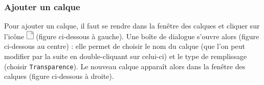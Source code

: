 \vfill
\phantom{rien}






\subsubsection{Ajouter un calque}\label{Gimp2CalquesAjouter}

Pour ajouter un calque, il faut se rendre dans la fenêtre des calques et cliquer sur l'icône \includegraphics[width=.4cm]{./images/image02/CalqueAjouter} (figure ci-dessous à gauche). Une boîte de dialogue s'ouvre alors (figure ci-dessous au centre) : elle permet de choisir le nom du calque (que l'on peut modifier par la suite en double-cliquant sur celui-ci) et le type de remplissage (choisir \texttt{Transparence}). Le nouveau calque apparaît alors dans la fenêtre des calques (figure ci-dessous à droite).

\vspace{12pt}

